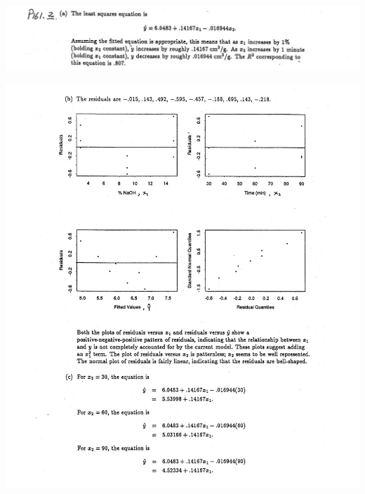 \documentclass[11pt]{article}\usepackage[]{graphicx}\usepackage[]{color}
\begin{document}
\begin{enumerate}
	\begin{center}
	\begin{minipage}{\linewidth}
		\centering
		\includegraphics[width=\textwidth]{05.JPG}
	\end{minipage}
\end{center}
	\begin{center}
	\begin{minipage}{\linewidth}
		\centering
		\includegraphics[width=\textwidth]{06.JPG}
	\end{minipage}
\end{center}


\end{enumerate}
\end{document}
